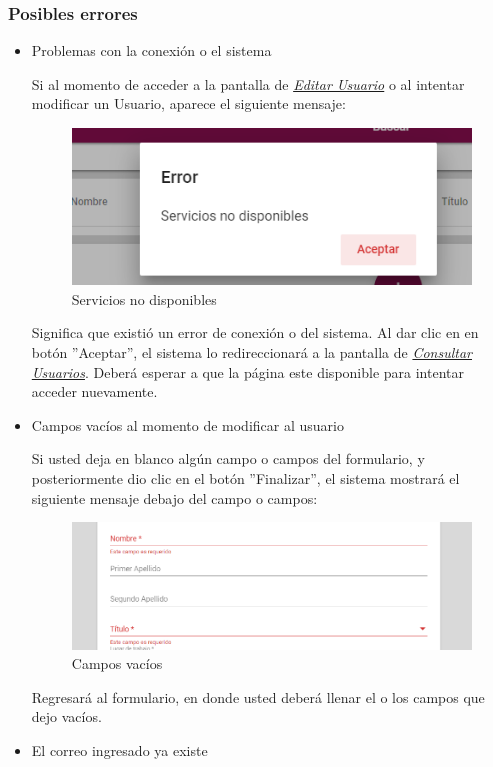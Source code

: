   \subsubsection{Posibles errores}
  \begin{itemize}
  	\item Problemas con la conexión o el sistema
  	
  	Si al momento de acceder a la pantalla de \hyperlink{editarUs}{\textit{Editar Usuario}} o al intentar modificar un Usuario, aparece el siguiente mensaje:
  	\clearpage
  	\begin{figure}[!hbtp]
  		\centering
  		\includegraphics[width=0.4\linewidth]{images/SP5/MSGSN}
  		\caption{Servicios no disponibles}
  		
  	\end{figure}
  	
  	
  	Significa que existió un error de conexión o del sistema. Al dar clic en en botón ''Aceptar'', el sistema lo redireccionará  a la pantalla de \hyperlink{consultarUs}{\textit{Consultar Usuarios}}. Deberá esperar a que la página este disponible para intentar acceder nuevamente.
  	
  	\item Campos vacíos al momento de modificar al usuario
  	
  	Si usted deja en blanco algún campo o campos del formulario, y posteriormente dio clic en el botón ''Finalizar'', el sistema mostrará el siguiente mensaje debajo del campo o campos:
  	
  	\begin{figure}[!hbtp]
  		\centering
  		\includegraphics[width=0.4\linewidth]{images/SP5/MSG44}
  		\caption{Campos vacíos}
  		\label{mensaje44}
  		
  	\end{figure}
  	
  	Regresará  al formulario, en donde usted deberá llenar el o los campos que dejo vacíos.
  	\item El correo ingresado ya existe
  	

\end{itemize}
